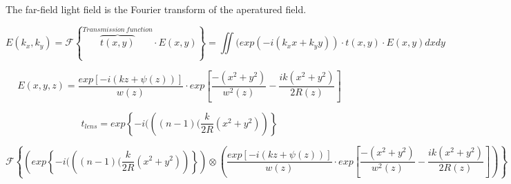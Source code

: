 The far-field light field is the Fourier transform of the aperatured field.
	
\begin{equation} 
E(k_{x},k_{y}) = \mathcal{F}\left\{{\overbrace{t(x,y)}^{Transmission\  function}\cdot E(x,y)}\right\} = \iint(exp(-i(k_{x} x + k_{y}y))\cdot t(x,y)\cdot E(x,y)dxdy 
\end{equation} 

\begin{equation}
E(x,y,z) = \frac{exp\left[-i(kz + \psi(z))\right]}{w(z)}\cdot exp\left[\frac{-(x^{2}+y^{2})}{w^{2}(z)}-\frac{ik(x^{2}+y^{2})}{2R(z)}\right]
\end{equation}

\begin{equation}
t_{lens} = exp\left\{-i(\left((n-1)(\frac{k}{2R}(x^{2}+y^{2})\right)\right\}
\end{equation}

\begin{equation}
\mathcal{F}\left\{\left(exp\left\{-i(\left((n-1)(\frac{k}{2R}(x^{2}+y^{2})\right)\right\}\right)\otimes\left(\frac{exp\left[-i(kz + \psi(z))\right]}{w(z)}\cdot exp\left[\frac{-(x^{2}+y^{2})}{w^{2}(z)}-\frac{ik(x^{2}+y^{2})}{2R(z)}\right]\right)\right\}
\end{equation}






